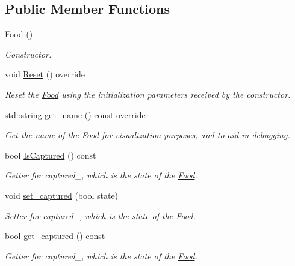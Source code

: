 \subsection*{Public Member Functions}
\begin{DoxyCompactItemize}
\item 
\hyperlink{classFood_a75d4d7f76fd495cc8133302ca9fdc485}{Food} ()
\begin{DoxyCompactList}\small\item\em Constructor. \end{DoxyCompactList}\item 
void \hyperlink{classFood_a1a12bfd50400e04b595c24a512317c1a}{Reset} () override\hypertarget{classFood_a1a12bfd50400e04b595c24a512317c1a}{}\label{classFood_a1a12bfd50400e04b595c24a512317c1a}

\begin{DoxyCompactList}\small\item\em Reset the \hyperlink{classFood}{Food} using the initialization parameters received by the constructor. \end{DoxyCompactList}\item 
std\+::string \hyperlink{classFood_a5c3bcd5109750a15ebb24b8a2a3cdd07}{get\+\_\+name} () const override
\begin{DoxyCompactList}\small\item\em Get the name of the \hyperlink{classFood}{Food} for visualization purposes, and to aid in debugging. \end{DoxyCompactList}\item 
bool \hyperlink{classFood_ad8a0272b043ea54dd8d3aa9fdbd014cf}{Is\+Captured} () const 
\begin{DoxyCompactList}\small\item\em Getter for captured\+\_\+, which is the state of the \hyperlink{classFood}{Food}. \end{DoxyCompactList}\item 
void \hyperlink{classFood_a1ad8a3c17f9ab764215320ec11c7c40d}{set\+\_\+captured} (bool state)\hypertarget{classFood_a1ad8a3c17f9ab764215320ec11c7c40d}{}\label{classFood_a1ad8a3c17f9ab764215320ec11c7c40d}

\begin{DoxyCompactList}\small\item\em Setter for captured\+\_\+, which is the state of the \hyperlink{classFood}{Food}. \end{DoxyCompactList}\item 
bool \hyperlink{classFood_ad5679d598f1066cd250986241f1ff9e6}{get\+\_\+captured} () const \hypertarget{classFood_ad5679d598f1066cd250986241f1ff9e6}{}\label{classFood_ad5679d598f1066cd250986241f1ff9e6}

\begin{DoxyCompactList}\small\item\em Getter for captured\+\_\+, which is the state of the \hyperlink{classFood}{Food}. \end{DoxyCompactList}\end{DoxyCompactItemize}
